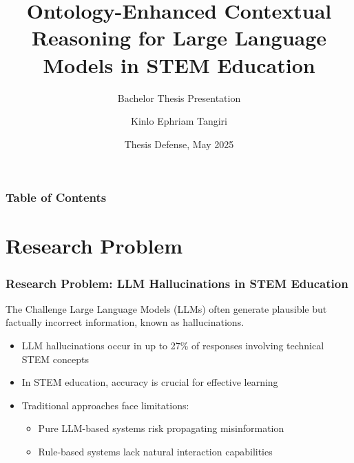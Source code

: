 \documentclass{beamer}
\title[Ontology-Enhanced LLMs] %
{Ontology-Enhanced Contextual Reasoning for Large Language Models in STEM Education}
\subtitle{Bachelor Thesis Presentation}
\author[Kinlo] %
{Kinlo Ephriam Tangiri}
\institute[Constructor University] %
{
  Department of Computer Science\\
  Constructor University\\
  \smallskip
  \small{Supervisor: Prof. Dr. Fatahi Valilai, Omid}
}
\date[May 2025] %
{Thesis Defense, May 2025}
\begin{document}
\frame{\titlepage}


\begin{frame}
\frametitle{Table of Contents}
\tableofcontents
\end{frame}


\section{Research Problem}

\begin{frame}
\frametitle{Research Problem: LLM Hallucinations in STEM Education}

\begin{block}{The Challenge}
Large Language Models (LLMs) often generate plausible but factually incorrect information, known as hallucinations.
\end{block}

\begin{itemize}
    \item<1-> LLM hallucinations occur in up to 27\% of responses involving technical STEM concepts
    \item<2-> In STEM education, accuracy is crucial for effective learning
    \item<3-> Traditional approaches face limitations:
    \begin{itemize}
        \item<3-> Pure LLM-based systems risk propagating misinformation
        \item<3-> Rule-based systems lack natural interaction capabilities
    \end{itemize}
\end{itemize}
\end{frame}

\end{document}
